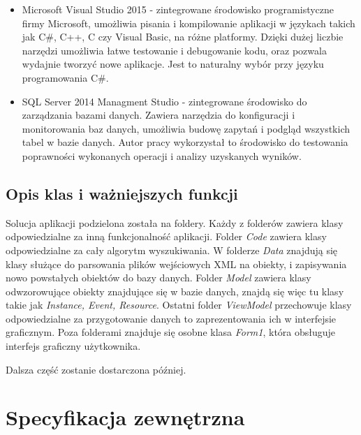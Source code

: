 \begin{itemize}
	\item Microsoft Visual Studio 2015 - zintegrowane środowisko programistyczne firmy Microsoft, umożliwia pisania i kompilowanie aplikacji w językach takich jak C\#, C++, C czy Visual Basic, na różne platformy. Dzięki dużej liczbie narzędzi umożliwia łatwe testowanie i debugowanie kodu, oraz pozwala wydajnie tworzyć nowe aplikacje. Jest to naturalny wybór przy języku programowania C\#.
	
	\item SQL Server 2014 Managment Studio - zintegrowane środowisko do zarządzania bazami danych. Zawiera narzędzia do konfiguracji i monitorowania baz danych, umożliwia budowę zapytań i podgląd wszystkich tabel w bazie danych. Autor pracy wykorzystał to środowisko do testowania poprawności wykonanych operacji i analizy uzyskanych wyników.
\end{itemize}

\subsection{Opis klas i ważniejszych funkcji}

Solucja aplikacji podzielona została na foldery. Każdy z folderów zawiera klasy odpowiedzialne za inną funkcjonalność aplikacji. Folder \textit{Code} zawiera klasy odpowiedzialne za cały algorytm wyszukiwania.  W folderze \textit{Data} znajdują się klasy służące do parsowania plików wejściowych XML na obiekty, i zapisywania nowo powstałych obiektów do bazy danych. Folder \textit{Model} zawiera klasy odwzorowujące obiekty znajdujące się w bazie danych, znajdą się więc tu klasy takie jak \textit{Instance, Event, Resource}. Ostatni folder \textit{ViewModel} przechowuje klasy odpowiedzialne za przygotowanie danych to zaprezentowania ich w interfejsie graficznym. Poza folderami znajduje się osobne klasa \textit{Form1}, która obsługuje interfejs graficzny użytkownika.

Dalsza część zostanie dostarczona później.


\section{Specyfikacja zewnętrzna}